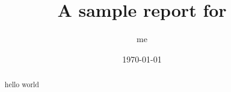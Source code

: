 \documentclass[journal]{IEEEtran}
\title{A sample report for 
}
\author{ me
}
\date{\today}
\begin{document}
\maketitle

\begin{abstract}
  hello world 
\end{abstract}





%
%
\end{document}

